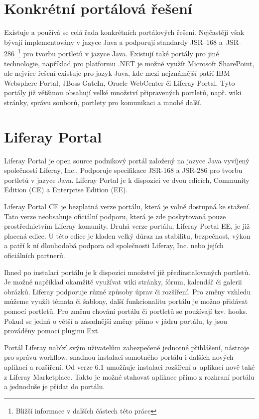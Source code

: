 \documentclass{fithesis}
\begin{document}
\section{Konkrétní portálová řešení}
Existuje a používá se celá řada konkrétních portálových řešení. Nejčastěji však bývají implementovány v jazyce Java a podporují standardy JSR--168 a~JSR--286~\footnote[2]{Bližší informace v dalších částech této práce} pro tvorbu portletů v jazyce Java. Existují také portály pro jiné technologie, například pro platformu .NET je možné využít Microsoft SharePoint, ale nejvíce řešení existuje pro jazyk Java, kde mezi nejznámější patří IBM Websphere Portal, JBoss GateIn, Oracle WebCenter či Liferay Portal. Tyto portály již většinou obsahují velké množství připravených portletů, např. wiki stránky, správu souborů, portlety pro komunikaci a mnohé další.

\section{Liferay Portal}
Liferay Portal je open source podnikový portál založený na jazyce Java vyvíjený společností Liferay, Inc.. Podporuje specifikace JSR-168 a JSR-286 pro tvorbu portletů v jazyce Java. Liferay Portal je k dispozici ve dvou edicích, Community Edition (CE) a Enterprise Edition (EE).

Liferay Portal CE je bezplatná verze portálu, která je volně dostupná ke stažení. Tato verze neobsahuje oficiální podporu, která je zde poskytovaná pouze prostřednictvím Liferay komunity. Druhá verze portálu, Liferay Portal EE, je již placená edice. U této edice je kladen velký důraz na stabilitu, bezpečnost, výkon a patří k ní dlouhodobá podpora od společnosti Liferay, Inc. nebo jejích oficiálních partnerů.

Ihned po instalaci portálu je k dispozici množství již předinstalovaných portletů. Je možné například okamžitě využívat wiki stránky, fórum, kalendář či galerii obrázků. Liferay podporuje různé způsoby úprav či rozšíření. Pro změny vzhledu můžeme využít témata či šablony, další funkcionalitu portálu je možno přidávat pomocí portletů. Pro změnu chování portálu či portletů se používají tzv. hooks. Pokud se jedná o větší a zásadnější změny přímo v jádru portálu, ty jsou prováděny pomocí pluginu Ext. \cite{developer-guide}

Portál Liferay nabízí svým uživatelům zabezpečené jednotné přihlášení, nástroje pro správu workflow, snadnou instalaci samotného portálu i dalších nových aplikací a rozšíření. Od verze 6.1 umožňuje instalaci rozšíření a~aplikací nově také z Liferay Marketplace. Takto je možné stahovat aplikace přímo z rozhraní portálu a jednoduše je přidat do portálu.
\end{document}
